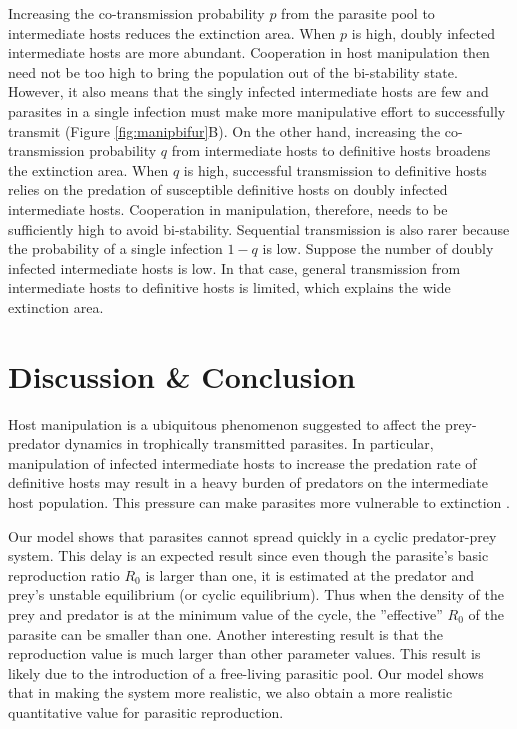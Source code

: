 \documentclass[11pt]{article}
\begin{document}
Increasing the co-transmission probability $p$ from the parasite pool to intermediate hosts reduces the extinction area. 
When $p$ is high, doubly infected intermediate hosts are more abundant. Cooperation in host manipulation then need not be too high to bring the population out of the bi-stability state. 
However, it also means that the singly infected intermediate hosts are few and parasites in a single infection must make more manipulative effort to successfully transmit (Figure \ref{fig:manipbifur}B). 
On the other hand, increasing the co-transmission probability $q$ from intermediate hosts to definitive hosts broadens the extinction area. 
When $q$ is high, successful transmission to definitive hosts relies on the predation of susceptible definitive hosts on doubly infected intermediate hosts. 
Cooperation in manipulation, therefore, needs to be sufficiently high to avoid bi-stability. 
Sequential transmission is also rarer because the probability of a single infection $1-q$ is low. 
Suppose the number of doubly infected intermediate hosts is low. 
In that case, general transmission from intermediate hosts to definitive hosts is limited, which explains the wide extinction area.

\section*{Discussion \& Conclusion}
Host manipulation is a ubiquitous phenomenon suggested to affect the prey-predator dynamics in trophically transmitted parasites. 
In particular, manipulation of infected intermediate hosts to increase the predation rate of definitive hosts may result in a heavy burden of predators on the intermediate host population.
This pressure can make parasites more vulnerable to extinction \citep{Hadeler1989,Fenton2006}. 

Our model shows that parasites cannot spread quickly in a cyclic predator-prey system. 
This delay is an expected result since even though the parasite's basic reproduction ratio $R_0$ is larger than one, it is estimated at the predator and prey's unstable equilibrium (or cyclic equilibrium). 
Thus when the density of the prey and predator is at the minimum value of the cycle, the ''effective'' $R_0$ of the parasite can be smaller than one. 
Another interesting result is that the reproduction value is much larger than other parameter values.
This result is likely due to the introduction of a free-living parasitic pool. Our model shows that in making the system more realistic, we also obtain a more realistic quantitative value for parasitic reproduction.
\end{document}
